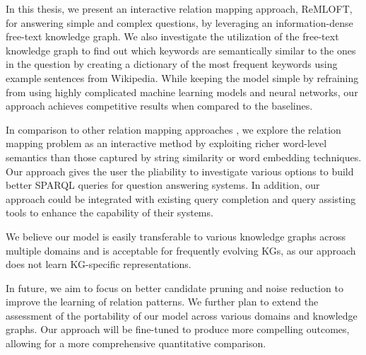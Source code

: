 In this thesis, we present an interactive relation mapping approach, ReMLOFT, for answering simple and complex questions, by leveraging an information-dense free-text knowledge graph. We also investigate the utilization of the free-text knowledge graph to find out which keywords are semantically similar to the ones in the question by creating a dictionary of the most frequent keywords using example sentences from Wikipedia. While keeping the model simple by refraining from using highly complicated machine learning models and neural networks, our approach achieves competitive results when compared to the baselines. 

In comparison to other relation mapping approaches \cite{falcon, falcon2, kbpearl}, we explore the relation mapping problem as an interactive method by exploiting richer word-level semantics than those captured by string similarity or word embedding techniques. Our approach gives the user the pliability to investigate various options to build better SPARQL queries for question answering systems. In addition, our approach could be integrated with existing query completion and query assisting tools to enhance the capability of their systems.

We believe our model is easily transferable to various knowledge graphs across multiple domains and is acceptable for frequently evolving KGs, as our approach does not learn KG-specific representations. 

In future, we aim to focus on better candidate pruning and noise reduction to improve the learning of relation patterns. We further plan to extend the assessment of the portability of our model across various domains and knowledge graphs. Our approach will be fine-tuned to produce more compelling outcomes, allowing for a more comprehensive quantitative comparison.
